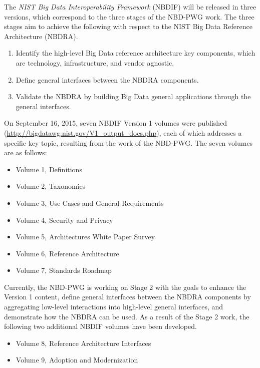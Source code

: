 \documentclass[9pt,]{article}
\providecommand{\tightlist}{%
  \setlength{\itemsep}{0pt}\setlength{\parskip}{0pt}}
\begin{document}
The \emph{NIST Big Data Interoperability Framework} (NBDIF) will be
released in three versions, which correspond to the three stages of the
NBD-PWG work. The three stages aim to achieve the following with respect
to the NIST Big Data Reference Architecture (NBDRA).

\begin{enumerate}
\def\labelenumi{\arabic{enumi}.}
\tightlist
\item
  Identify the high-level Big Data reference architecture key
  components, which are technology, infrastructure, and vendor agnostic.
\item
  Define general interfaces between the NBDRA components.
\item
  Validate the NBDRA by building Big Data general applications through
  the general interfaces.
\end{enumerate}

On September 16, 2015, seven NBDIF Version 1 volumes were published
(\url{http://bigdatawg.nist.gov/V1_output_docs.php}), each of which
addresses a specific key topic, resulting from the work of the NBD-PWG.
The seven volumes are as follows:

\begin{itemize}
\tightlist
\item
  Volume 1, Definitions
\item
  Volume 2, Taxonomies
\item
  Volume 3, Use Cases and General Requirements
\item
  Volume 4, Security and Privacy
\item
  Volume 5, Architectures White Paper Survey
\item
  Volume 6, Reference Architecture
\item
  Volume 7, Standards Roadmap
\end{itemize}

Currently, the NBD-PWG is working on Stage 2 with the goals to enhance
the Version 1 content, define general interfaces between the NBDRA
components by aggregating low-level interactions into high-level general
interfaces, and demonstrate how the NBDRA can be used. As a result of
the Stage 2 work, the following two additional NBDIF volumes have been
developed.

\begin{itemize}
\tightlist
\item
  Volume 8, Reference Architecture Interfaces
\item
  Volume 9, Adoption and Modernization
\end{itemize}
\end{document}
